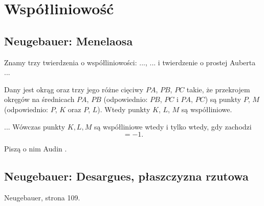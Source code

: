 
\section{Współliniowość}
\subsection{Neugebauer: Menelaosa}
Znamy trzy twierdzenia o współliniowości: ..., ... i twierdzenie o prostej Auberta ...

\begin{proposition}
	Dany jest okrąg oraz trzy jego różne cięciwy $PA$, $PB$, $PC$ takie, że przekrojem okręgów na średnicach $PA$, $PB$ (odpowiednio: $PB$, $PC$ i $PA$, $PC$) są punkty $P$, $M$ (odpowiednio: $P$, $K$ oraz $P$, $L$).
	Wtedy punkty $K$, $L$, $M$ są współliniowe.
\end{proposition}

\begin{proposition}
	...
	Wówczas punkty $K, L, M$ są współliniowe wtedy i tylko wtedy, gdy zachodzi
	\begin{equation}
		[AMB] [BKC] [CLA] = -1.
	\end{equation}
\end{proposition}

Piszą o nim Audin \cite[s. 38]{audin_2003}.





\subsection{Neugebauer: Desargues, płaszczyzna rzutowa}

\begin{proposition}
	Neugebauer, strona 109.
\end{proposition}

